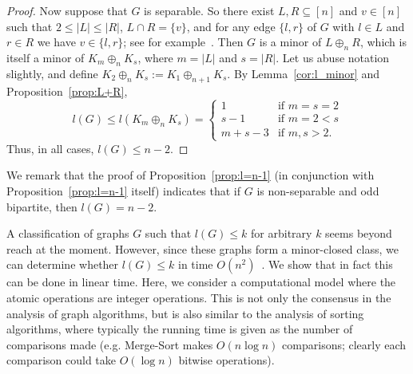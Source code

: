 \documentclass[ALCO,ThmDefs,Unicode,epreuves]{cedram}
\newcommand{\nset}{[n]}
\begin{document}
\begin{proof}
 Now suppose that $G$ is separable. So there exist $L, R \subseteq \nset$ and $v\in\nset$ such that $2 \le |L| \le |R|$, $L
 \cap R = \{v\}$, and for any edge $\{l,r\}$ of $G$ with $l \in L$ and $r \in
 R$ we have $v \in \{l,r\}$; see for example~\cite[Theorems~5.1 and~5.2]{Bondy2008aa}. Then $G$ is a minor of $L \oplus_n R$, which is
 itself a minor of $K_m\oplus_nK_s$, where $m=|L|$ and $s=|R|$. Let us abuse notation slightly, and define $K_2\oplus_nK_s := K_1\oplus_{n+1}K_s$. By 
 Lemma~\ref{cor:l_minor} and Proposition~\ref{prop:L+R},
 \[
 l(G)\leq l(K_m\oplus_nK_s) = \begin{cases}
 1 &\text{if $m=s=2$}\\
 s-1 &\text{if $m=2<s$}\\
 m+s-3 &\text{if $m,s>2$.}
 \end{cases}
 \]
 Thus, in all cases, $l(G)\leq n-2$.
\end{proof}

We remark that the proof of Proposition~\ref{prop:l=n-1} (in conjunction with
Proposition~\ref{prop:l=n-1} itself) indicates that if $G$ is non-separable and
odd bipartite, then $l(G) = n-2$. 

A classification of graphs $G$ such that
$l(G) \le k$ for arbitrary $k$ seems beyond reach at the moment. However, since
these graphs form a minor-closed class, we can determine whether $l(G) \le k$
in time $O(n^2)$~\cite{Kawarabayashi2012aa}. We show that in fact this can be done in linear
time. Here, we consider a computational model where the atomic operations are integer operations. This is not only the consensus in the analysis of graph algorithms, but is also similar to the analysis of sorting algorithms, where typically the running time is given as the number of comparisons made (e.g. Merge-Sort makes $O(n \log n)$ comparisons; clearly each comparison could take $O(\log n)$ bitwise operations).
\end{document}
